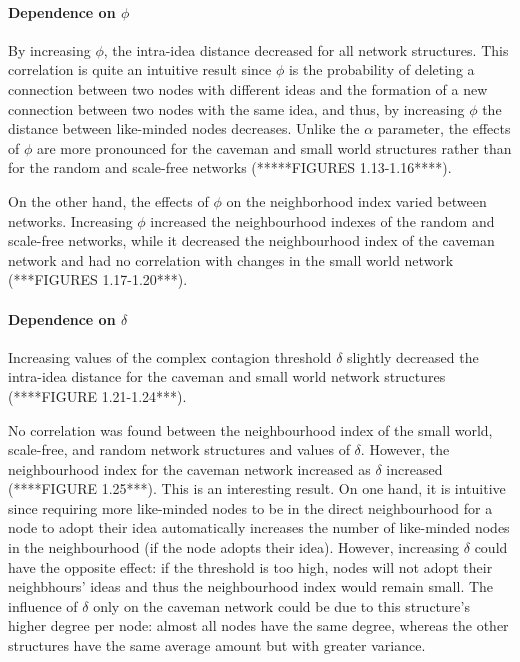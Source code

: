 \paragraph{Dependence on $\phi$}
By increasing $\phi$, the intra-idea distance decreased for all network structures. This correlation is quite an intuitive result since $\phi$ is the probability of deleting a connection between two nodes with different ideas and the formation of a new connection between two nodes with the same idea, and thus, by increasing $\phi$ the distance between like-minded nodes decreases. Unlike the $\alpha$ parameter, the effects of $\phi$ are more pronounced for the caveman and small world structures rather than for the random and scale-free networks (*****FIGURES 1.13-1.16****).

On the other hand, the effects of $\phi$ on the neighborhood index varied between networks. Increasing $\phi$ increased the neighbourhood indexes of the random and scale-free networks, while it decreased the neighbourhood index of the caveman network and had no correlation with changes in the small world network (***FIGURES 1.17-1.20***).

\paragraph{Dependence on $\delta$}
Increasing values of the complex contagion threshold $\delta$ slightly decreased the intra-idea distance for the caveman and small world network structures (****FIGURE 1.21-1.24***). 

No correlation was found between the neighbourhood index of the small world, scale-free, and random network structures and values of $\delta$. However, the neighbourhood index for the caveman network increased as $\delta$ increased (****FIGURE 1.25***). This is an interesting result. On one hand, it is intuitive since requiring more like-minded nodes to be in the direct neighbourhood for a node to adopt their idea automatically increases the number of like-minded nodes in the neighbourhood (if the node adopts their idea). However, increasing $\delta$ could have the opposite effect: if the threshold is too high, nodes will not adopt their neighbhours' ideas and thus the neighbourhood index would remain small. The influence of $\delta$ only on the caveman network could be due to this structure's higher degree per node: almost all nodes have the same degree, whereas the other structures have the same average amount but with greater variance.


